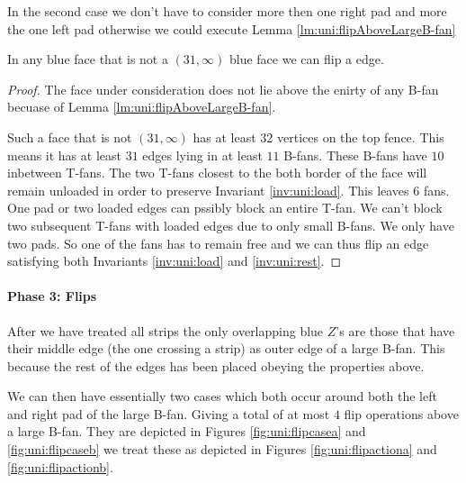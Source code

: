 In the second case we don't have to consider more then one right pad and more the one left pad otherwise we could execute Lemma \ref{lm:uni:flipAboveLargeB-fan}

\begin{lemma}
  \label{lm:}
  In any blue face that is not a $(31, \infty)$ blue face  we can flip a edge.
\end{lemma}
\begin{proof}
  The face under consideration does not lie above the enirty of any B-fan becuase of Lemma \ref{lm:uni:flipAboveLargeB-fan}.

  Such a face that is not $(31, \infty)$ has at least $32$ vertices on the top fence. This means it has at least $31$ edges lying in at least $11$ B-fans. These B-fans have $10$ inbetween T-fans. The two T-fans  closest to the both border of the face will remain unloaded in order to preserve Invariant \ref{inv:uni:load}. This leaves $6$ fans. One pad or two loaded edges can pssibly block an entire T-fan. We can't block two subsequent T-fans with loaded edges due to only small B-fans. We only have two pads. So one of the fans has to remain free and we can thus flip an edge satisfying both Invariants \ref{inv:uni:load} and \ref{inv:uni:rest}.
\end{proof}


\paragraph{Phase 3: Flips}
After we have treated all strips the only overlapping blue $Z$'s are those that have their middle  edge (the one crossing a strip) as outer edge of a large B-fan. This because the rest of the edges has been placed obeying the properties above.




We can then have essentially two cases which both occur around  both the left and right pad of the large B-fan. Giving  a total of at most $4$ flip operations above a large B-fan.
They are depicted in Figures \ref{fig:uni:flipcasea} and \ref{fig:uni:flipcaseb} we treat these as depicted in Figures \ref{fig:uni:flipactiona} and \ref{fig:uni:flipactionb}.



